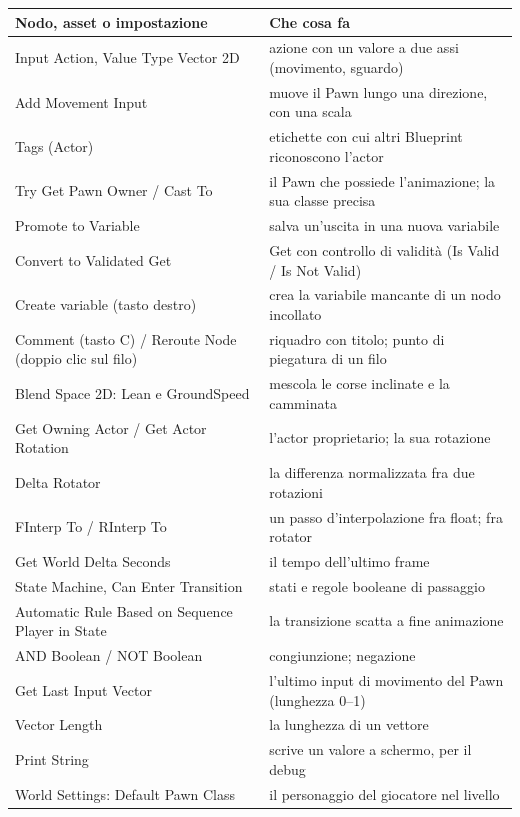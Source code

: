 \begin{table}[htbp]
\centering
\small
\begin{tabular}{@{}p{4.8cm}p{9.2cm}@{}}
\toprule
\textbf{Nodo, asset o impostazione} & \textbf{Che cosa fa} \\
\midrule
Input Action, Value Type Vector 2D & azione con un valore a due assi (movimento,
sguardo) \\
Add Movement Input & muove il Pawn lungo una direzione, con una scala \\
Tags (Actor) & etichette con cui altri Blueprint riconoscono l'actor \\
Try Get Pawn Owner / Cast To & il Pawn che possiede l'animazione; la sua classe precisa \\
Promote to Variable & salva un'uscita in una nuova variabile \\
Convert to Validated Get & Get con controllo di validità (Is Valid / Is Not Valid) \\
Create variable (tasto destro) & crea la variabile mancante di un nodo incollato \\
Comment (tasto C) / Reroute Node (doppio clic sul filo) & riquadro con titolo; punto di
piegatura di un filo \\
Blend Space 2D: Lean e GroundSpeed & mescola le corse inclinate e la camminata \\
Get Owning Actor / Get Actor Rotation & l'actor proprietario; la sua rotazione \\
Delta Rotator & la differenza normalizzata fra due rotazioni \\
FInterp To / RInterp To & un passo d'interpolazione fra float; fra rotator \\
Get World Delta Seconds & il tempo dell'ultimo frame \\
State Machine, Can Enter Transition & stati e regole booleane di passaggio \\
Automatic Rule Based on Sequence Player in State & la transizione scatta a fine
animazione \\
AND Boolean / NOT Boolean & congiunzione; negazione \\
Get Last Input Vector & l'ultimo input di movimento del Pawn (lunghezza 0--1) \\
Vector Length & la lunghezza di un vettore \\
Print String & scrive un valore a schermo, per il debug \\
World Settings: Default Pawn Class & il personaggio del giocatore nel livello \\

\end{tabular}
\end{table}
